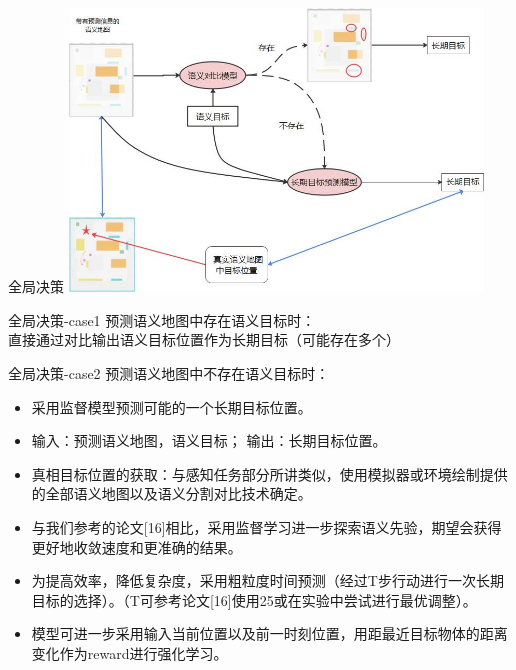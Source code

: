 \begin{frame}{全局决策}
    \centering
    \includegraphics[width=11cm]{assets/global_policy.png}
\end{frame}

\begin{frame}{全局决策-case1}
         预测语义地图中存在语义目标时：\\直接通过对比输出语义目标位置作为长期目标（可能存在多个）
\end{frame}

\begin{frame}{全局决策-case2}
     预测语义地图中不存在语义目标时：
              \begin{itemize}
                  \item 采用监督模型预测可能的一个长期目标位置。
                  \item 输入：预测语义地图，语义目标； 输出：长期目标位置。
                  \item 真相目标位置的获取：与感知任务部分所讲类似，使用模拟器或环境绘制提供的全部语义地图以及语义分割对比技术确定。
                  \item 与我们参考的论文[16]相比，采用监督学习进一步探索语义先验，期望会获得更好地收敛速度和更准确的结果。
                  \item 为提高效率，降低复杂度，采用粗粒度时间预测（经过T步行动进行一次长期目标的选择）。（T可参考论文[16]使用25或在实验中尝试进行最优调整）。
                  \item 模型可进一步采用输入当前位置以及前一时刻位置，用距最近目标物体的距离变化作为reward进行强化学习。
              \end{itemize}
\end{frame}